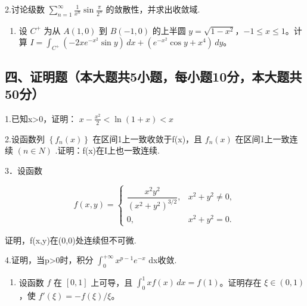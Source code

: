 \documentclass[11pt,fontset=fandol]{ctexart}
\providecommand{\tightlist}{\setlength{\itemsep}{0pt}\setlength{\parskip}{0pt}}
\begin{document}
2.讨论级数
\(\sum _ { n = 1 } ^ { \infty } { \frac { 1 } { x ^ { n } } } \sin { \frac { \pi } { 2 ^ { n } } }\)
的敛散性，并求出收敛域.

\begin{enumerate}
\def\labelenumi{\arabic{enumi}.}
\setcounter{enumi}{2}
\tightlist
\item
  设 \(C^+\) 为从 \(A(1,0)\) 到 \(B(-1,0)\) 的上半圆
  \(y=\sqrt{1-x^2}\)，\(-1\leq x\leq1\)。计算
  \(I=\int_{C^+}(-2xe^{-x^2}\sin y)\,dx+(e^{-x^2}\cos y+x^4)\,dy\)。
\end{enumerate}

\subsection{四、证明题（本大题共5小题，每小题10分，本大题共50分）}\label{ux56dbux8bc1ux660eux9898ux672cux5927ux9898ux51715ux5c0fux9898ux6bcfux5c0fux989810ux5206ux672cux5927ux9898ux517150ux5206}

1.已知x\textgreater0，证明：
\(x - \frac { x ^ { 2 } } { 2 } < \ln ( 1 + x ) < x\)

2.设函数列 \(\left\{ f _ { n } ( x ) \right\}\)
在区间1上一致收敛于f(x)，且 \(f _ { n } ( x )\) 在区间1上一致连续
\(( n \in N )\) .证明：f(x)在I上也一致连续.

3．设函数

\[
f(x,y)=\begin{cases}\dfrac{x^2y^2}{(x^2+y^2)^{3/2}},&x^2+y^2\neq0,\\0,&x^2+y^2=0.\end{cases}
\]

证明，f(x,y)在(0,0)处连续但不可微.

4.证明，当p\textgreater0时，积分
\(\int _ { 0 } ^ { + \infty } x ^ { p - 1 } e ^ { - x }\) dx收敛.

\begin{enumerate}
\def\labelenumi{\arabic{enumi}.}
\setcounter{enumi}{4}
\tightlist
\item
  设函数 \(f\) 在 \([0,1]\) 上可导，且
  \(\int_0^1xf(x)\,dx=f(1)\)。证明存在 \(\xi\in(0,1)\)，使
  \(f'(\xi)=-f(\xi)/\xi\)。
\end{enumerate}
\end{document}
